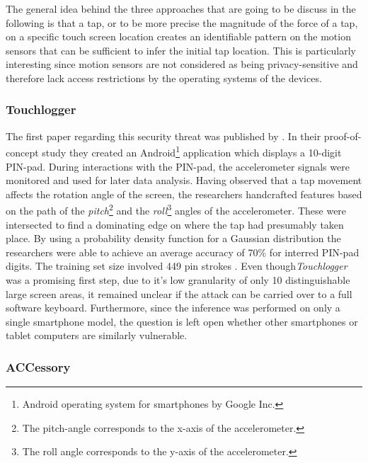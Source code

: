 The general idea behind the three approaches that are going to be discuss in the following is that a tap, or to be more precise the magnitude of the force of a tap, on a specific touch screen location creates an identifiable pattern on the motion sensors that can be sufficient to infer the initial tap location. This is particularly interesting since motion sensors are not considered as being privacy-sensitive and therefore lack access restrictions by the operating systems of the devices.

\subsubsection{Touchlogger}

The first paper regarding this security threat was published by \citeauthor{Touchlogger}. In their proof-of-concept study they created an Android\footnote{Android operating system for smartphones by Google Inc.} application which displays a 10-digit PIN-pad. During interactions with the PIN-pad, the accelerometer signals were monitored and used for later data analysis. Having observed that a tap movement affects the rotation angle of the screen, the researchers handcrafted features based on the path of the \textit{pitch}\footnote{The pitch-angle corresponds to the x-axis of the accelerometer.} and the \textit{roll}\footnote{The roll angle corresponds to the y-axis of the accelerometer.} angles of the accelerometer. These were intersected to find a dominating edge on where the tap had presumably taken place. By using a probability density function for a Gaussian distribution the researchers were able to achieve an average accuracy of 70\% for interred PIN-pad digits. The training set size involved 449 pin strokes \cite{Touchlogger}. Even though\textit{Touchlogger} was a promising first step, due to it's low granularity of only 10 distinguishable large screen areas, it remained unclear if the attack can be carried over to a full software keyboard. Furthermore, since the inference was performed on only a single smartphone model, the question is left open whether other smartphones or tablet computers are similarly vulnerable.

\subsubsection{ACCessory}

